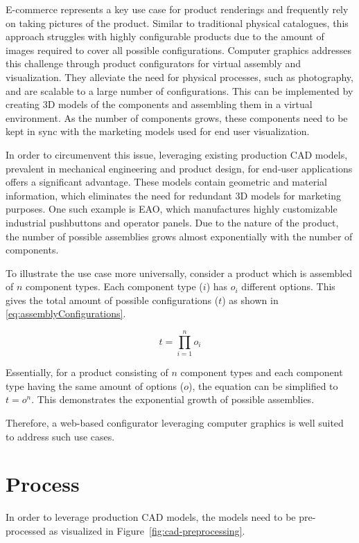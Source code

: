 E-commerce represents a key use case for product renderings and frequently rely on taking pictures of the product. Similar to traditional physical catalogues, this approach struggles with highly configurable products due to the amount of images required to cover all possible configurations. Computer graphics addresses this challenge through product configurators for virtual assembly and visualization. They alleviate the need for physical processes, such as photography, and are scalable to a large number of configurations. This can be implemented by creating 3D models of the components and assembling them in a virtual environment. As the number of components grows, these components need to be kept in sync with the marketing models used for end user visualization.

In order to circumenvent this issue, leveraging existing production CAD models, prevalent in mechanical engineering and product design, for end-user applications offers a significant advantage. These models contain geometric and material information, which eliminates the need for redundant 3D models for marketing purposes. One such example is EAO, which manufactures highly customizable industrial pushbuttons and operator panels. Due to the nature of the product, the number of possible assemblies grows almost exponentially with the number of components.

To illustrate the use case more universally, consider a product which is assembled of $n$ component types. Each component type ($i$) has $o_i$ different options. This gives the total amount of possible configurations ($t$) as shown in \autoref{eq:assemblyConfigurations}.

\begin{equation}
  t = \prod_{i=1}^n o_i
  \label{eq:assemblyConfigurations}
\end{equation}

Essentially, for a product consisting of $n$ component types and each component type having the same amount of options ($o$), the equation can be simplified to $t = o^n$. This demonstrates the exponential growth of possible assemblies.

Therefore, a web-based configurator leveraging computer graphics is well suited to address such use cases.

\section{Process}

In order to leverage production CAD models, the models need to be pre-processed as visualized in Figure~\ref{fig:cad-preprocessing}. 

